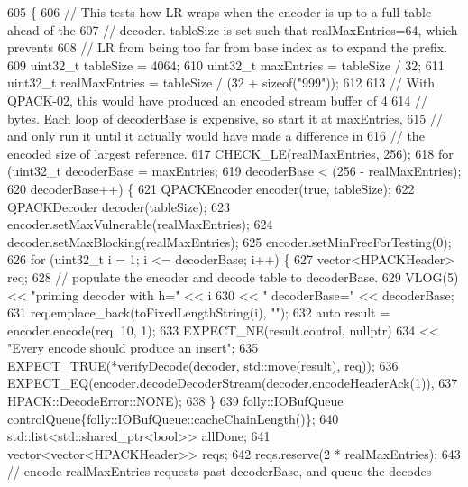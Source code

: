 \begin{DoxyCode}
605                                      \{
606   \textcolor{comment}{// This tests how LR wraps when the encoder is up to a full table ahead of the}
607   \textcolor{comment}{// decoder.  tableSize is set such that realMaxEntries=64, which prevents}
608   \textcolor{comment}{// LR from being too far from base index as to expand the prefix.}
609   uint32\_t tableSize = 4064;
610   uint32\_t maxEntries = tableSize / 32;
611   uint32\_t realMaxEntries = tableSize / (32 + \textcolor{keyword}{sizeof}(\textcolor{stringliteral}{"999"}));
612 
613   \textcolor{comment}{// With QPACK-02, this would have produced an encoded stream buffer of 4}
614   \textcolor{comment}{// bytes.  Each loop of decoderBase is expensive, so start it at maxEntries,}
615   \textcolor{comment}{// and only run it until it actually would have made a difference in}
616   \textcolor{comment}{// the encoded size of largest reference.}
617   CHECK\_LE(realMaxEntries, 256);
618   \textcolor{keywordflow}{for} (uint32\_t decoderBase = maxEntries;
619        decoderBase < (256 - realMaxEntries);
620        decoderBase++) \{
621     QPACKEncoder encoder(\textcolor{keyword}{true}, tableSize);
622     QPACKDecoder decoder(tableSize);
623     encoder.setMaxVulnerable(realMaxEntries);
624     decoder.setMaxBlocking(realMaxEntries);
625     encoder.setMinFreeForTesting(0);
626     \textcolor{keywordflow}{for} (uint32\_t i = 1; i <= decoderBase; i++) \{
627       vector<HPACKHeader> req;
628       \textcolor{comment}{// populate the encoder and decode table to decoderBase.}
629       VLOG(5) << \textcolor{stringliteral}{"priming decoder with h="} << i
630               << \textcolor{stringliteral}{" decoderBase="} << decoderBase;
631       req.emplace\_back(toFixedLengthString(i), \textcolor{stringliteral}{""});
632       \textcolor{keyword}{auto} result = encoder.encode(req, 10, 1);
633       EXPECT\_NE(result.control, \textcolor{keyword}{nullptr})
634         << \textcolor{stringliteral}{"Every encode should produce an insert"};
635       EXPECT\_TRUE(*verifyDecode(decoder, std::move(result), req));
636       EXPECT\_EQ(encoder.decodeDecoderStream(decoder.encodeHeaderAck(1)),
637                 HPACK::DecodeError::NONE);
638     \}
639     folly::IOBufQueue controlQueue\{folly::IOBufQueue::cacheChainLength()\};
640     std::list<std::shared\_ptr<bool>> allDone;
641     vector<vector<HPACKHeader>> reqs;
642     reqs.reserve(2 * realMaxEntries);
643     \textcolor{comment}{// encode realMaxEntries requests past decoderBase, and queue the decodes}

\end{DoxyCode}
